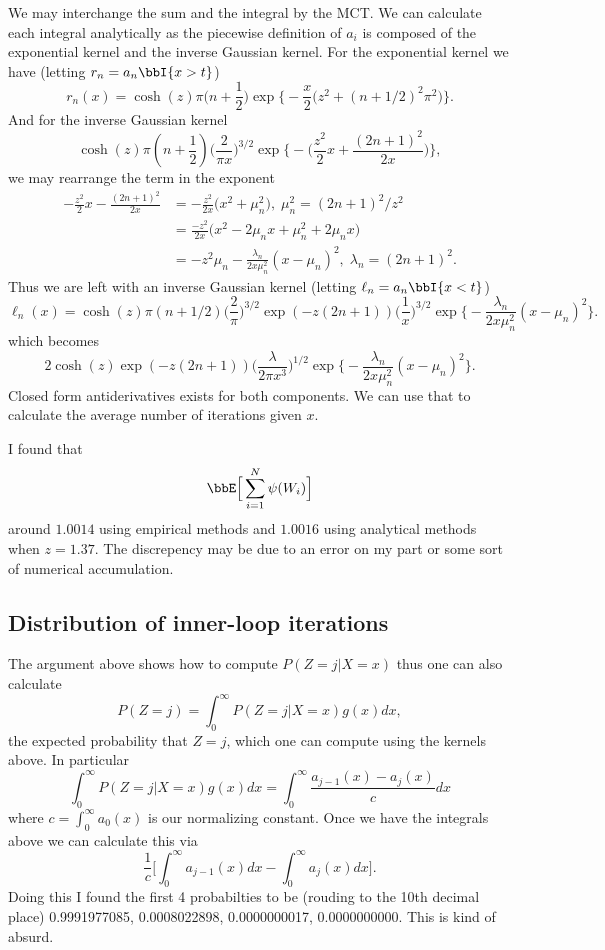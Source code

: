 \documentclass[draft]{article}
\begin{document}
We may interchange the sum and the integral by the MCT.  We can calculate each
integral analytically as the piecewise definition of $a_i$ is composed of the
exponential kernel and the inverse Gaussian kernel.  For the exponential kernel
we have (letting $r_n = a_n \bbI \{x > t\}$)
\[
r_n(x) = \cosh(z) \pi \Big(n + \frac{1}{2}\Big) 
\exp \Big\{ -\frac{x}{2} \Big( z^2 + (n+1/2)^2 \pi^2 \Big) \Big\}.
\]
And for the inverse Gaussian kernel
\[
\cosh(z)
\pi (n+\frac{1}{2}) \Big(\frac{2}{\pi x}\Big)^{3/2}
  \exp \Big\{ - \Big( \frac{z^2}{2} x + \frac{(2n+1)^2}{2x} \Big) \Big\},
\]
we may rearrange the term in the exponent
\begin{align*}
- \frac{z^2}{2}x - \frac{(2n + 1)^2}{2x}
& = -\frac{z^2}{2x} \Big( x^2 + \mu_n^2 \Big), \; \mu_n^2 = (2n+1)^2 / z^2
\\
& = \frac{-z^2}{2x} \Big( x^2 - 2 \mu_n x + \mu_n^2 + 2 \mu_n x \Big) \\
& = -z^2 \mu_n - \frac{\lambda_n}{2x \mu_n^2} (x - \mu_n)^2, \; \lambda_n =
(2n+1)^2.
\end{align*}
Thus we are left with an inverse Gaussian kernel (letting $\ell_n = a_n \bbI \{x
< t\}$)
\[
\ell_n(x) = 
\cosh(z) \pi (n + 1/2) \Big(\frac{2}{\pi}\Big)^{3/2} \exp(-z (2n+1))
\Big(\frac{1}{x}\Big)^{3/2}
\exp \Big\{ -\frac{\lambda_n}{2x\mu_n^2}(x-\mu_n)^2 \Big\}.
\]
which becomes
\[
2 \cosh(z) \exp(-z(2n+1))
\Big(\frac{\lambda}{2 \pi x^3}\Big)^{1/2} 
\exp \Big\{ -\frac{\lambda_n}{2x\mu_n^2}(x-\mu_n)^2 \Big\}.
\]
Closed form antiderivatives exists for both components.  We can use that to
calculate the average number of iterations given $x$.

I found that 
\[
\bbE \Big[\sum_{i=1}^N \psi(W_i) \Big]
\]
around $1.0014$ using empirical methods and $1.0016$ using analytical methods
when $z = 1.37$.  The discrepency may be due to an error on my part or some sort
of numerical accumulation.

\subsection{Distribution of inner-loop iterations}

The argument above shows how to compute $P(Z = j | X = x)$ thus one can also
calculate
\[
P(Z = j) = \int_{0}^\infty P(Z = j | X = x) g(x) dx,
\]
the expected probability that $Z = j$, which one can compute using the kernels
above.  In particular
\[
\int_{0}^\infty P(Z = j | X = x) g(x) dx = \int_0^\infty \frac{a_{j-1}(x) -
  a_j(x)}{c} dx
\]
where $c = \int_0^\infty a_0(x)$ is our normalizing constant.  Once we have the
integrals above we can calculate this via
\[
\frac{1}{c} \Big[ \int_0^\infty a_{j-1}(x) dx - \int_0^\infty  a_j(x) dx \Big].
\]
Doing this I found the first 4 probabilties to be (rouding to the 10th decimal
place) 0.9991977085, 0.0008022898, 0.0000000017, 0.0000000000.  This is kind
of absurd.
\end{document}
